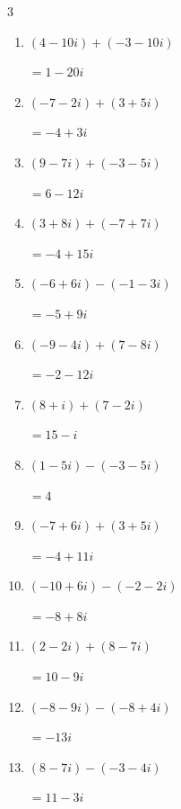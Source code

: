 \begin{multicols}{3}
\begin{enumerate}
        $\displaystyle =-1-8i$

  \item $\displaystyle (4-10i) + (-3-10i)$

        $\displaystyle =1-20i$

  \item $\displaystyle (-7-2i) + (3+5i)$

        $\displaystyle =-4+3i$

  \item $\displaystyle (9-7i) + (-3-5i)$

        $\displaystyle =6-12i$

  \item $\displaystyle (3+8i) + (-7+7i)$

        $\displaystyle =-4+15i$

  \item $\displaystyle (-6+6i) - (-1-3i)$

        $\displaystyle =-5+9i$

  \item $\displaystyle (-9-4i) + (7-8i)$

        $\displaystyle =-2-12i$

  \item $\displaystyle (8+i) + (7-2i)$

        $\displaystyle =15-i$

  \item $\displaystyle (1-5i) - (-3-5i)$

        $\displaystyle =4$

  \item $\displaystyle (-7+6i) + (3+5i)$

        $\displaystyle =-4+11i$

  \item $\displaystyle (-10+6i) - (-2-2i)$

        $\displaystyle =-8+8i$

\columnbreak %

  \item $\displaystyle (2-2i) + (8-7i)$

        $\displaystyle =10-9i$

  \item $\displaystyle (-8-9i) - (-8+4i)$

        $\displaystyle =-13i$

  \item $\displaystyle (8-7i) - (-3-4i)$

        $\displaystyle =11-3i$


\end{enumerate}
\end{multicols}
